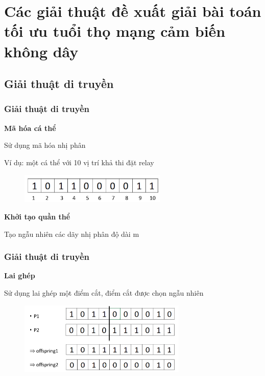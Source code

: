 \section{Các giải thuật đề xuất giải bài toán tối ưu tuổi thọ mạng cảm biến không dây}
\subsection{Giải thuật di truyền}
\begin{frame}
    \frametitle{Giải thuật di truyền}
    \textbf{Mã hóa cá thể}
    
    Sử dụng mã hóa nhị phân 
    
    Ví dụ: một cá thể với 10 vị trí khả thi đặt relay

    \begin{figure}[h]
        \centering
        \includegraphics[width=7cm]{picture/indi_encoding.png}
    \end{figure}

    \textbf{Khởi tạo quần thể}

    Tạo ngẫu nhiên các dãy nhị phân độ dài m 
\end{frame}

\begin{frame}
    \frametitle{Giải thuật di truyền}
    
    \textbf{Lai ghép}

    Sử dụng lai ghép một điểm cắt, điểm cắt được chọn ngẫu nhiên
       
    \begin{figure}[h]
        \centering
        \includegraphics[width=8cm]{picture/crossover.png}
    \end{figure}

\end{frame}

